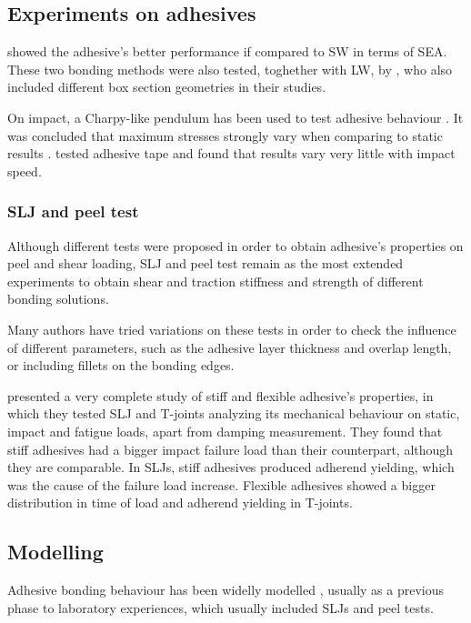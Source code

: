 \subsection{Experiments on adhesives}
\citet{Lee2006} showed the adhesive's better performance if compared to \gls{SW} in terms of \gls{SEA}. These two bonding methods were also tested, toghether with \gls{LW}, by \citet{Peroni2009}, who also included different box section geometries in their studies.

On impact, a Charpy-like pendulum has been used to test adhesive behaviour \citep{Goglio2008, Kadioglu2014}. It was concluded that maximum stresses strongly vary when comparing to static results \citep{Goglio2008}. \citet{Kadioglu2014} tested adhesive tape and found that results vary very little with impact speed.

\subsubsection{\Gls{SLJ} and peel test}

Although different tests were proposed \citep{Kihara2003, Raykhere2010} in order to obtain adhesive's properties on peel and shear loading, \gls{SLJ} and peel test remain as the most extended experiments to obtain shear and traction stiffness and strength of different bonding solutions.

Many authors have tried variations on these tests \citep{Grant2009, Liao2011} in order to check the influence of different parameters, such as the adhesive layer thickness and overlap length, or including fillets on the bonding edges.

\citet{Loureiro2010} presented a very complete study of stiff and flexible adhesive's properties, in which they tested \gls{SLJ} and T-joints analyzing its mechanical behaviour on static, impact and fatigue loads, apart from damping measurement. They found that stiff adhesives had a bigger impact failure load than their counterpart, although they are comparable. In \glspl{SLJ}, stiff adhesives produced adherend yielding, which was the cause of the failure load increase. Flexible adhesives showed a bigger distribution in time of load and adherend yielding in T-joints.

\subsection{Modelling}

Adhesive bonding behaviour has been widelly modelled \citep{Sato2000, Alfano2001, Kihara2003, Vaidya2006, Wu2006, Hou2008, Grant2009, Peroni2009, Sadowski2010, Scattina2011, Sadowski2011, Liao2011, Yang2012}, usually as a previous phase to laboratory experiences, which usually included \glspl{SLJ} and peel tests.

